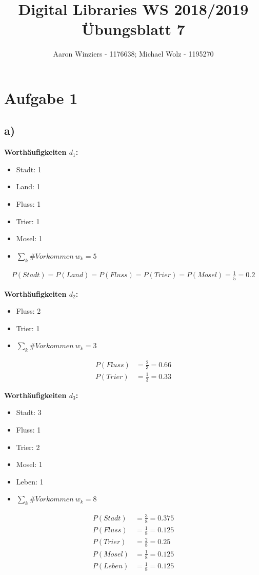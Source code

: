 \documentclass[11pt,a4paper,parskip=half ]{scrartcl}
\author{Aaron Winziers - 1176638; Michael Wolz - 1195270}
\title{Digital Libraries WS 2018/2019\\\LARGE{Übungsblatt 7}}
\begin{document}
	\maketitle
	
	\section*{Aufgabe 1}
	\subsection*{a)}
	
	\textbf{Worthäufigkeiten $d_1$:}
	\begin{itemize}
		\item Stadt: 1
		\item Land: 1
		\item Fluss: 1
		\item Trier: 1
		\item Mosel: 1
		\item $\sum_{k}\#Vorkommen\ w_k = 5$
	\end{itemize}
	
	\begin{align*}
	P(Stadt) = P(Land) = P(Fluss) = P(Trier) = P(Mosel) = \frac{1}{5} = 0.2
	\end{align*}
	
	\textbf{Worthäufigkeiten $d_2$:}
	\begin{itemize}
		\item Fluss: 2
		\item Trier: 1
		\item $\sum_{k}\#Vorkommen\ w_k = 3$
	\end{itemize}
	
	\begin{align*}
	P(Fluss) &= \frac{2}{3} = 0.66\\
	P(Trier) &= \frac{1}{3} = 0.33
	\end{align*}
	
	\textbf{Worthäufigkeiten $d_3$:}
	\begin{itemize}
		\item Stadt: 3
		\item Fluss: 1
		\item Trier: 2
		\item Mosel: 1
		\item Leben: 1
		\item $\sum_{k}\#Vorkommen\ w_k = 8$
	\end{itemize}
	
	\begin{align*}
	P(Stadt) &= \frac{3}{8} = 0.375\\
	P(Fluss) &= \frac{1}{8} = 0.125\\
	P(Trier) &= \frac{2}{8} = 0.25\\
	P(Mosel) &= \frac{1}{8} = 0.125\\
	P(Leben) &= \frac{1}{8} = 0.125
	\end{align*}
	
\end{document}
